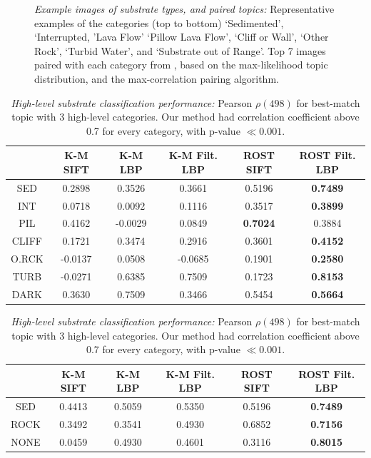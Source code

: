 \begin{figure}
\begin{minipage}{0.69\linewidth}
{            \label{fig:substrate-exout}
        }
    \end{minipage}
  \caption{
  	\emph{Example images of substrate types, and paired topics:}
    \protect{} Representative examples of the categories (top to bottom) `Sedimented', `Interrupted, 'Lava Flow'  `Pillow Lava Flow', `Cliff or Wall', `Other Rock', `Turbid Water', and `Substrate out of Range'.
	\protect{} Top 7 images paired with each category from
	\protect{}, based on the max-likelihood topic distribution, and the max-correlation pairing algorithm.
  }
  \label{fig:substrate-examples}
\end{figure}%

\begin{table}
    \centering
    \caption{\emph{Detailed substrate classification performance:}
    Pearson $\rho\left(498\right)$ for best-match topic with 7 ground truth categories (see \ref{fig:substrate-best1gt}). For ROST Filt. LBP p-value was $\ll 0.001$. Our method had the highest correlation for every category except PIL}
    \begin{tabular}{|c|ccccc|}
        \hline
              & K-M SIFT & K-M LBP & K-M Filt. LBP & ROST SIFT & \textbf{ROST Filt. LBP}\\
        \hline \hline
        SED   &  0.2898 &  0.3526 &  0.3661 & 0.5196 & \textbf{0.7489} \\
        INT   &  0.0718 &  0.0092 &  0.1116 & 0.3517 & \textbf{0.3899} \\
        PIL   &  0.4162 & -0.0029 &  0.0849 & \textbf{0.7024} & 0.3884 \\
        CLIFF &  0.1721 &  0.3474 &  0.2916 & 0.3601 & \textbf{0.4152} \\
        O.RCK & -0.0137 &  0.0508 & -0.0685 & 0.1901 & \textbf{0.2580} \\
        TURB  & -0.0271 &  0.6385 &  0.7509 & 0.1723 & \textbf{0.8153} \\
        DARK  &  0.3630 &  0.7509 &  0.3466 & 0.5454 & \textbf{0.5664} \\
        \hline
    \end{tabular}
    \label{tab:substrate-performance-7}

    \caption{\emph{High-level substrate classification performance:}
         Pearson $\rho\left(498\right)$ for best-match topic with 3 high-level categories. Our method had correlation coefficient above 0.7 for every category, with p-value $\ll 0.001$.}
    \begin{tabular}{|c|ccccc|}
        \hline
             & K-M SIFT & K-M LBP & K-M Filt. LBP & ROST SIFT & \textbf{ROST Filt. LBP}\\
        \hline \hline
        SED  &  0.4413 &  0.5059 &  0.5350 & 0.5196 & \textbf{0.7489} \\
        ROCK &  0.3492 &  0.3541 &  0.4930 & 0.6852 & \textbf{0.7156} \\
        NONE &  0.0459 &  0.4930 &  0.4601 & 0.3116 & \textbf{0.8015} \\
        \hline
    \end{tabular}
    \label{tab:substrate-performance-3}
    

\end{table}
